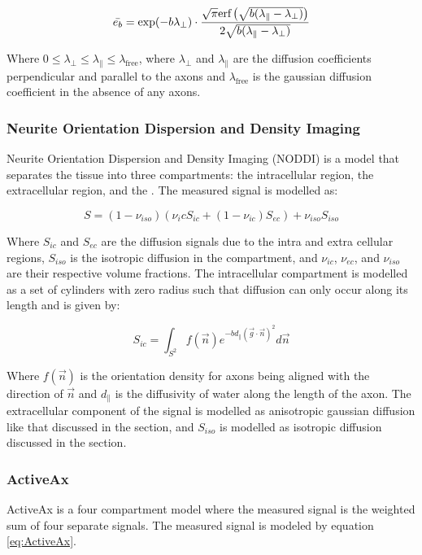 \begin{equation}
    \bar{e_b} = \exp(-b \lambda_\perp) \cdot
    \frac{\sqrt{\pi}\text{erf} \left(\sqrt{b (\lambda_\parallel - \lambda_\perp)}\right)}
    {2 \sqrt{b (\lambda_\parallel - \lambda_\perp)}}
\end{equation}

Where $0 \leq \lambda_\perp \leq \lambda_\parallel \leq \lambda_\text{free}$, where $\lambda_\perp$ and $\lambda_\parallel$ are the diffusion coefficients perpendicular and parallel to the axons and $\lambda_\text{free}$ is the gaussian diffusion coefficient in the absence of any axons. \cite{kaden2016quantitative}

\subsubsection{Neurite Orientation Dispersion and Density Imaging}
Neurite Orientation Dispersion and Density Imaging (NODDI) is a model that separates the tissue into three compartments: the intracellular region, the extracellular region, and the \csf. The measured signal is modelled as:

\begin{equation}
    S = (1 - \nu_{iso})(\nu_ic S_{ic} + (1- \nu_{ic}) S_{ec}) + \nu_{iso} S_{iso}
\end{equation}

Where $S_{ic}$ and $S_{ec}$ are the diffusion signals due to the intra and extra cellular regions, $S_{iso}$ is the isotropic diffusion in the \csf compartment, and $\nu_{ic}$, $\nu_{ec}$, and $\nu_{iso}$ are their respective volume fractions. The intracellular compartment is modelled as a set of cylinders with zero radius such that diffusion can only occur along its length and is given by:

\begin{equation}
    S_{ic} = \int_{S^2} f(\vec{n}) e^{-b d_\parallel (\vec{g} \cdot \vec{n})^2} d\vec{n}
\end{equation}

Where $f(\vec{n})$ is the orientation density for axons being aligned with the direction of $\vec{n}$ and $d_\parallel$ is the diffusivity of water along the length of the axon. The extracellular component of the signal is modelled as anisotropic gaussian diffusion like that discussed in the \dti section, and $S_{iso}$ is modelled as isotropic diffusion discussed in the \dmri section. \cite{zhang2012noddi}

\subsubsection{ActiveAx}
ActiveAx is a four compartment model where the measured signal is the weighted sum of four separate signals. The measured signal is modeled by equation \ref{eq:ActiveAx}. \cite{alexander2010orientationally}

